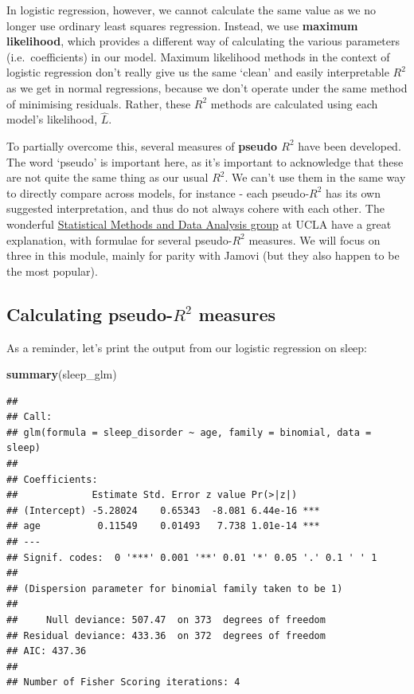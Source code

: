 \documentclass[
]{book}
\newenvironment{Shaded}{\begin{snugshade}}{\end{snugshade}}
\newcommand{\FunctionTok}[1]{\textcolor[rgb]{0.13,0.29,0.53}{\textbf{#1}}}
\newcommand{\NormalTok}[1]{#1}
\begin{document}
In logistic regression, however, we cannot calculate the same value as we no longer use ordinary least squares regression. Instead, we use \textbf{maximum likelihood}, which provides a different way of calculating the various parameters (i.e.~coefficients) in our model. Maximum likelihood methods in the context of logistic regression don't really give us the same `clean' and easily interpretable \(R^2\) as we get in normal regressions, because we don't operate under the same method of minimising residuals. Rather, these \(R^2\) methods are calculated using each model's likelihood, \(\hat L\).

To partially overcome this, several measures of \textbf{pseudo \(R^2\)} have been developed. The word `pseudo' is important here, as it's important to acknowledge that these are not quite the same thing as our usual \(R^2\). We can't use them in the same way to directly compare across models, for instance - each pseudo-\(R^2\) has its own suggested interpretation, and thus do not always cohere with each other. The wonderful \href{https://stats.oarc.ucla.edu/other/mult-pkg/faq/general/faq-what-are-pseudo-r-squareds/}{Statistical Methods and Data Analysis group} at UCLA have a great explanation, with formulae for several pseudo-\(R^2\) measures. We will focus on three in this module, mainly for parity with Jamovi (but they also happen to be the most popular).

\subsection{\texorpdfstring{Calculating pseudo-\(R^2\) measures}{Calculating pseudo-R\^{}2 measures}}\label{calculating-pseudo-r2-measures}

As a reminder, let's print the output from our logistic regression on sleep:

\begin{Shaded}
\begin{Highlighting}[]
\FunctionTok{summary}\NormalTok{(sleep\_glm)}
\end{Highlighting}
\end{Shaded}

\begin{verbatim}
## 
## Call:
## glm(formula = sleep_disorder ~ age, family = binomial, data = sleep)
## 
## Coefficients:
##             Estimate Std. Error z value Pr(>|z|)    
## (Intercept) -5.28024    0.65343  -8.081 6.44e-16 ***
## age          0.11549    0.01493   7.738 1.01e-14 ***
## ---
## Signif. codes:  0 '***' 0.001 '**' 0.01 '*' 0.05 '.' 0.1 ' ' 1
## 
## (Dispersion parameter for binomial family taken to be 1)
## 
##     Null deviance: 507.47  on 373  degrees of freedom
## Residual deviance: 433.36  on 372  degrees of freedom
## AIC: 437.36
## 
## Number of Fisher Scoring iterations: 4
\end{verbatim}
\end{document}
